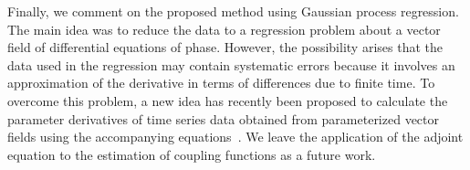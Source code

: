 Finally, we comment on the proposed method using Gaussian process regression. The main idea was to reduce the data to a regression problem about a vector field of differential equations of phase. However, the possibility arises that the data used in the regression may contain systematic errors because it involves an approximation of the derivative in terms of differences due to finite time. To overcome this problem, a new idea has recently been proposed to calculate the parameter derivatives of time series data obtained from parameterized vector fields using the accompanying equations~\cite{chen2018,li2020}. We leave the application of the adjoint equation to the estimation of coupling functions as a future work.
